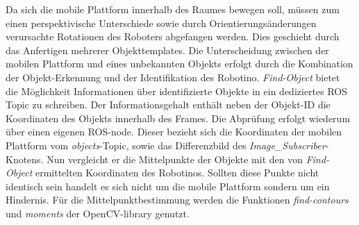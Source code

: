 	Da sich die mobile Plattform innerhalb des Raumes bewegen soll, müssen zum einen perspektivische Unterschiede sowie durch Orientierungsänderungen verursachte Rotationen des Roboters abgefangen werden. Dies geschieht durch das Anfertigen mehrerer Objekttemplates.\newline
	Die Unterscheidung zwischen der mobilen Plattform und eines unbekannten Objekts erfolgt durch die Kombination der Objekt-Erkennung und der Identifikation des Robotino. \textit{Find-Object} bietet die Möglichkeit Informationen über identifizierte Objekte in ein dediziertes ROS Topic zu schreiben. Der Informationsgehalt enthält neben der Objekt-ID die Koordinaten des Objekts innerhalb des Frames. Die Abprüfung erfolgt wiederum über einen eigenen ROS-node. Dieser bezieht sich die Koordinaten der mobilen Plattform vom \textit{objects}-Topic, sowie das Differenzbild des \textit{Image\_Subscriber}-Knotens. Nun vergleicht er die Mittelpunkte der Objekte mit den von \textit{Find-Object} ermittelten Koordinaten des Robotinos. Sollten diese Punkte nicht identisch sein handelt es sich nicht um die mobile Plattform sondern um ein Hindernis. Für die Mittelpunktbestimmung werden die Funktionen \textit{find-contours} und \textit{moments} der OpenCV-library genutzt. 

